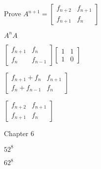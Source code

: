 \documentclass{exam}
\begin{document}
\begin{questions}
\begin{center}
Prove 
\( A^{n+1} =
\begin{bmatrix}
f_{n+2} & f_{n+1}\\
f_{n+1} & f_{n}
\end{bmatrix}
\)

\(A^{n} A\)

\(
\begin{bmatrix}
f_{n+1} & f_{n}\\
f_{n} & f_{n-1}
\end{bmatrix}
\begin{bmatrix}
1 & 1\\
1 & 0
\end{bmatrix}
\)

\(
\begin{bmatrix}
f_{n+1} + f_{n} & f_{n+1}\\
f_{n} + f_{n-1} & f_{n}
\end{bmatrix}
\)

\(
\begin{bmatrix}
f_{n+2} & f_{n+1}\\
f_{n+1} & f_{n}
\end{bmatrix}
\)

\end{center}

\newpage




\vspace{10pt}
{\Large Chapter 6}
\vspace{2pt}

\begin{subparts}

\begin{center}

\( 52^8 \)

\end{center}


\begin{center}

\( 62^8 \)

\end{center}


\end{subparts}
\end{questions}
\end{document}
